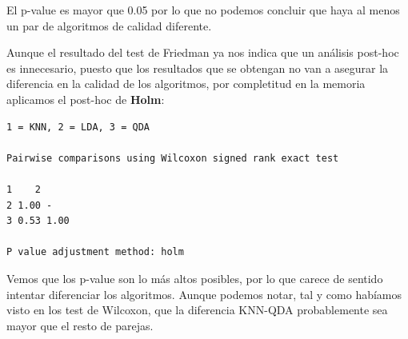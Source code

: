 El p-value es mayor que 0.05 por lo que no podemos concluir que haya al menos un par de algoritmos de calidad diferente.

\vspace{\baselineskip}
\vspace{\baselineskip}

Aunque el resultado del test de Friedman ya nos indica que un análisis post-hoc es innecesario, puesto que los resultados que se obtengan no van a asegurar la diferencia en la calidad de los algoritmos, por completitud en la memoria aplicamos el post-hoc de \textbf{Holm}:

\begin{verbatim}
1 = KNN, 2 = LDA, 3 = QDA

Pairwise comparisons using Wilcoxon signed rank exact test 

1    2   
2 1.00 -   
3 0.53 1.00
    
P value adjustment method: holm 
\end{verbatim}

Vemos que los p-value son lo más altos posibles, por lo que carece de sentido intentar diferenciar los algoritmos. Aunque podemos notar, tal y como habíamos visto en los test de Wilcoxon, que la diferencia KNN-QDA probablemente sea mayor que el resto de parejas.
